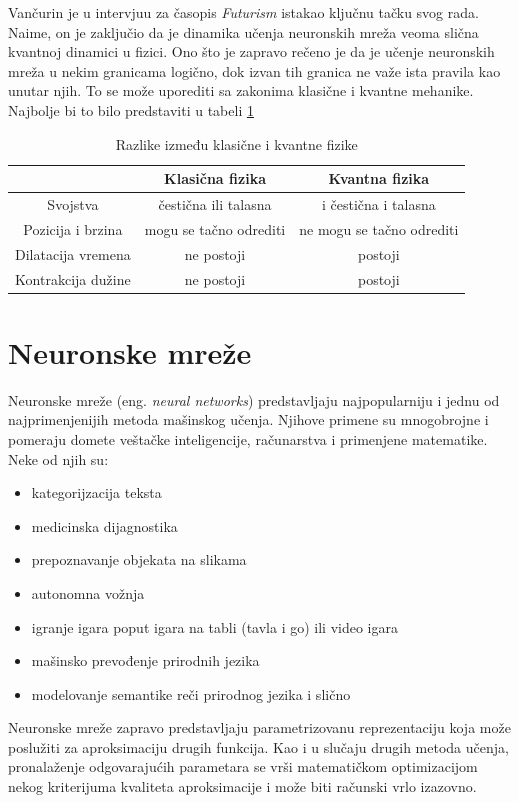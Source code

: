 \documentclass[a4paper]{article}
\begin{document}
 Vančurin je u intervjuu za časopis \textit{Futurism} \cite{7} istakao ključnu tačku svog rada. Naime, on je zaključio da je dinamika učenja neuronskih mreža veoma slična kvantnoj dinamici u fizici. Ono što je zapravo rečeno je da je učenje neuronskih mreža u nekim granicama logično, dok izvan tih granica ne važe ista pravila kao unutar njih. To se može uporediti sa zakonima klasične i kvantne mehanike. Najbolje bi to bilo predstaviti u tabeli \ref{tab:tabela1}


\begin{table}[h!]
\begin{center}
{\footnotesize
\begin{tabular}{|c|c|c|} \hline
 & Klasična fizika& Kvantna fizika\\ \hline
Svojstva& čestična ili talasna & i čestična i talasna\\ \hline
Pozicija i brzina& mogu se tačno odrediti& ne mogu se  tačno odrediti\\ \hline 
Dilatacija vremena& ne postoji & postoji \\ \hline
Kontrakcija dužine& ne postoji& postoji\\ \hline
\end{tabular}
\caption{Razlike između klasične i kvantne fizike}
\label{tab:tabela1}
}
\end{center}
\end{table}





\section{Neuronske mreže}
\label{sec:naslov1}
Neuronske mreže (eng. {\textit{neural networks}}) predstavljaju najpopularniju i jednu od najprimenjenijih metoda mašinskog učenja. Njihove primene su mnogobrojne i pomeraju domete veštačke inteligencije, računarstva i primenjene matematike. Neke od njih su:
\begin{itemize}
  \item kategorijzacija teksta
  \item medicinska dijagnostika
  \item prepoznavanje objekata na slikama
  \item autonomna vožnja
  \item igranje igara poput igara na tabli (tavla i go) ili video igara
  \item mašinsko prevođenje prirodnih jezika
  \item modelovanje semantike reči prirodnog jezika i slično
\end{itemize}
Neuronske mreže zapravo predstavljaju parametrizovanu reprezentaciju koja može poslužiti za aproksimaciju drugih funkcija. Kao i u slučaju drugih metoda učenja, pronalaženje odgovarajućih parametara se vrši matematičkom optimizacijom nekog kriterijuma kvaliteta aproksimacije i može biti računski vrlo izazovno.
\end{document}
